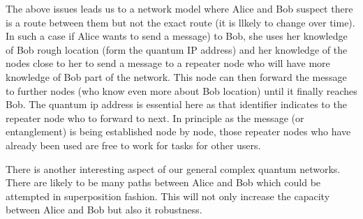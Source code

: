 \documentclass[twocolumn, aps, rmp, amsmath, amssymb, nofootinbib, superscriptaddress, longbibliography, floatfix, table-of-contents, eqsecnum]{revtex4-1}
\begin{document}
The above issues leads us to a network model where Alice and Bob suspect there is a route between them but not the exact route (it is llkely to change over time). In such a case if Alice wants to send a message) to Bob, she uses her knowledge of Bob rough location (form the quantum IP address) and her knowledge of the nodes close to her to send a message to a repeater node who will have more knowledge of  Bob part of the network. This node can then forward the message to further nodes (who know even more about Bob location) until it finally reaches Bob. The quantum ip address is essential here as that identifier indicates to the repeater node who to forward to next. In principle as the message (or entanglement) is being established node by node, those repeater nodes who have already been used are free to work for tasks for other users. 

There is another interesting aspect of our general complex quantum networks. There are likely to be many paths between Alice and Bob which could be attempted in superposition fashion. This will not only increase the capacity between Alice and Bob but also it robustness. 
\end{document}
